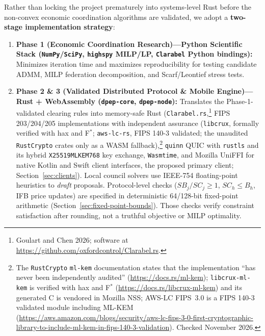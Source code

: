 \documentclass[10pt,twoside,openany]{book}
\theoremstyle{dpepstyle}
\begin{document}
Rather than locking the project prematurely into systems-level Rust before the non-convex economic coordination algorithms are validated, we adopt a \textbf{two-stage implementation strategy}:
\begin{enumerate}[leftmargin=1.8em,itemsep=2pt]
  \item \textbf{Phase 1 (Economic Coordination Research)---\allowbreak Python Scientific Stack (\texttt{NumPy}/\allowbreak\texttt{SciPy}, \texttt{highspy} MILP/LP, \texttt{Clarabel} Python bindings):} Minimizes iteration time and maximizes reproducibility for testing candidate ADMM, MILP federation decomposition, and Scarf/Leontief stress tests.
  \item \textbf{Phase 2 \& 3 (Validated Distributed Protocol \& Mobile Engine)---\allowbreak Rust + WebAssembly (\texttt{dpep-core}, \texttt{dpep-node}):} Translates the Phase-1-validated clearing rules into memory-safe Rust (\texttt{Clarabel.rs},\footnote{Goulart and Chen 2026; software at \url{https://github.com/oxfordcontrol/Clarabel.rs}.} FIPS 203/204/205 implementations with independent assurance (\texttt{libcrux}, formally verified with hax and F$^\ast$; \texttt{aws-lc-rs}, FIPS 140-3 validated; the unaudited \texttt{RustCrypto} crates only as a WASM fallback),\footnote{The \texttt{RustCrypto} \texttt{ml-kem} documentation states that the implementation ``has never been independently audited'' (\url{https://docs.rs/ml-kem}); \texttt{libcrux-ml-kem} is verified with hax and F$^\ast$ (\url{https://docs.rs/libcrux-ml-kem}) and its generated C is vendored in Mozilla NSS; AWS-LC FIPS~3.0 is a FIPS 140-3 validated module including ML-KEM (\url{https://aws.amazon.com/blogs/security/aws-lc-fips-3-0-first-cryptographic-library-to-include-ml-kem-in-fips-140-3-validation}). Checked November 2026.} \texttt{quinn} QUIC with \texttt{rustls} and its hybrid \texttt{X25519MLKEM768} key exchange, \texttt{Wasmtime}, and Mozilla UniFFI for native Kotlin and Swift client interfaces, the proposed primary client; Section~\ref{sec:clients}). Local council solvers use IEEE-754 floating-point heuristics to \emph{draft} proposals. Protocol-level checks ($SB_j/SC_j \ge 1$, $SC_h \le B_h$, IFB price updates) are specified in deterministic 64/128-bit fixed-point arithmetic (Section~\ref{sec:fixed-point-bounds}). Those checks verify constraint satisfaction after rounding, not a truthful objective or MILP optimality.
\end{enumerate}
\end{document}
